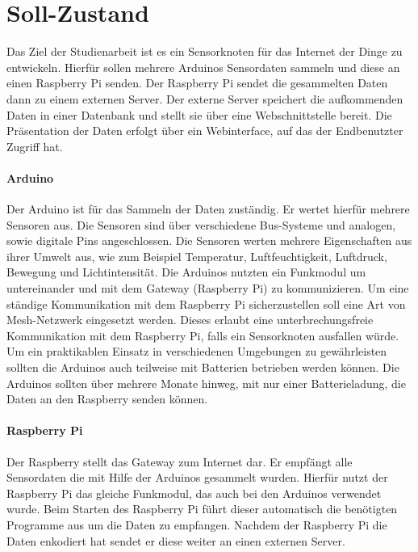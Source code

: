 
\section{Soll-Zustand}
\label{sec:SollZustand}
Das Ziel der Studienarbeit ist es ein Sensorknoten für das Internet der Dinge zu entwickeln. Hierfür sollen mehrere Arduinos Sensordaten sammeln und diese an einen Raspberry Pi senden. Der Raspberry Pi sendet die gesammelten Daten dann zu einem externen Server. Der externe Server speichert die aufkommenden Daten in einer Datenbank und stellt sie über eine Webschnittstelle bereit. Die Präsentation der Daten erfolgt über ein Webinterface, auf das der Endbenutzter Zugriff hat. 
\paragraph{Arduino} Der Arduino ist für das Sammeln der Daten zuständig. Er wertet hierfür mehrere Sensoren aus. Die Sensoren sind über verschiedene Bus-Systeme und analogen, sowie digitale Pins angeschlossen. Die Sensoren werten mehrere Eigenschaften aus ihrer Umwelt aus, wie zum Beispiel Temperatur, Luftfeuchtigkeit, Luftdruck, Bewegung und Lichtintensität. 
Die Arduinos nutzten ein Funkmodul um untereinander und mit dem Gateway (Raspberry Pi) zu kommunizieren. Um eine ständige Kommunikation mit dem Raspberry Pi sicherzustellen soll eine Art von Mesh-Netzwerk eingesetzt werden. Dieses erlaubt eine unterbrechungsfreie Kommunikation mit dem Raspberry Pi, falls ein Sensorknoten ausfallen würde.
Um ein praktikablen Einsatz in verschiedenen Umgebungen zu gewährleisten sollten die Arduinos auch teilweise mit Batterien betrieben werden können. Die Arduinos sollten über mehrere Monate hinweg, mit nur einer Batterieladung, die Daten an den Raspberry senden können.
\paragraph{Raspberry Pi}
Der Raspberry stellt das Gateway zum Internet dar. Er empfängt alle Sensordaten die mit Hilfe der Arduinos gesammelt wurden. Hierfür nutzt der Raspberry Pi das gleiche Funkmodul, das auch bei den Arduinos verwendet wurde. Beim Starten des Raspberry Pi führt dieser automatisch die benötigten Programme aus um die Daten zu empfangen. Nachdem der Raspberry Pi die Daten enkodiert hat sendet er diese weiter an einen externen Server.
